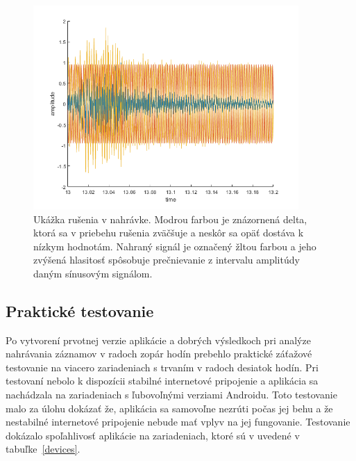 \begin{figure}[!hbt]
	\centering
	\includegraphics[width=0.9\textwidth]{obrazky-figures/noise.png}
	\caption{Ukážka rušenia v nahrávke. Modrou farbou je znázornená delta, ktorá sa v priebehu rušenia zväčšuje a neskôr sa opäť dostáva k nízkym hodnotám. Nahraný signál je označený žltou farbou a jeho zvýšená hlasitosť spôsobuje prečnievanie z intervalu amplitúdy daným sínusovým signálom.}
	\label{noise}
\end{figure}

\FloatBarrier
\pagebreak

\subsection*{Praktické testovanie}

Po vytvorení prvotnej verzie aplikácie a dobrých výsledkoch pri analýze nahrávania záznamov v radoch zopár hodín prebehlo praktické záťažové testovanie na viacero zariadeniach s trvaním v radoch desiatok hodín. Pri testovaní nebolo k dispozícii stabilné internetové pripojenie a aplikácia sa nachádzala na zariadeniach s ľubovoľnými verziami Androidu. Toto testovanie malo za úlohu dokázať že, aplikácia sa samovoľne nezrúti počas jej behu a že nestabilné internetové pripojenie nebude mať vplyv na jej fungovanie. Testovanie dokázalo spoľahlivosť aplikácie na zariadeniach, ktoré sú v uvedené v tabuľke~\ref{devices}.

